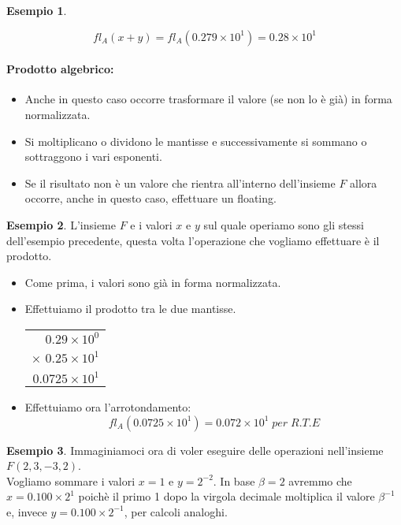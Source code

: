 \documentclass[12pt, a4paper]{book}
\theoremstyle{definition}
\newtheorem{exmp}{Esempio}[section]
\begin{document}
\begin{flushleft}
\begin{exmp}
\begin{itemize}
 	\[ fl_{A}(x+y) = fl_{A}(0.279 \times 10^{1}) = 0.28 \times 10^{1} \]
\end{itemize}
\end{exmp}

\paragraph{Prodotto algebrico: } 
\begin{itemize}
	\item Anche in questo caso occorre trasformare il valore (se non lo è già) in forma normalizzata. 
	\item Si moltiplicano o dividono le mantisse e successivamente si sommano o sottraggono i vari esponenti. 
	\item Se il risultato non è un valore che rientra all'interno dell'insieme $F$ allora occorre, anche in questo caso, effettuare un floating. 
\end{itemize}

\begin{exmp}
L'insieme $F$ e i valori $x$ e $y$ sul quale operiamo sono gli stessi dell'esempio precedente, questa volta l'operazione che vogliamo effettuare è il prodotto. 
\begin{itemize}
	\item Come prima,  i valori sono già in forma normalizzata.
	\item Effettuiamo il prodotto tra le due mantisse.\\
	\vspace{1em}
	 \begin{tabular}{r}
    		$0.29 \times 10^{0}$ \\ 
    		$\times$ $0.25 \times 10^{1}$  \\ 
     	\hline
     	$0.0725 \times 10^{1}$     
	 \end{tabular}
	\item Effettuiamo ora l'arrotondamento: 
	\[ fl_{A}(0.0725 \times 10^{1}) = 0.072 \times 10^{1} \; per \; R.T.E\]
\end{itemize}
\end{exmp}

\begin{exmp}

Immaginiamoci ora di voler eseguire delle operazioni nell'insieme $F(2,3,-3,2)$.\\ 
Vogliamo sommare i valori $x=1$  e $y=2^{-2}$.  In base $\beta = 2$ avremmo che $x = 0.100 \times 2^{1}$ poichè il primo 1 dopo la virgola decimale moltiplica il valore $\beta^{-1}$ e, invece $y = 0.100 \times 2^{-1}$, per calcoli analoghi. 


\end{exmp}
\end{flushleft}
\end{document}
